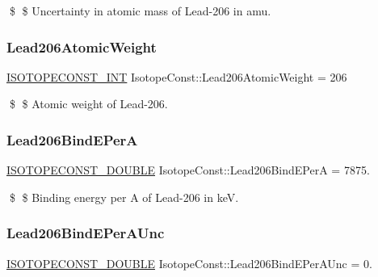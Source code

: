 \$ \$ Uncertainty in atomic mass of Lead-\/206 in amu. \mbox{\label{group___isotope_const-_lead-_pb206_ga0783575b865cbbc1b8d82b9f4f8f1622}} 
\subsubsection{\texorpdfstring{Lead206\+Atomic\+Weight}{Lead206AtomicWeight}}
{\footnotesize\ttfamily \mbox{\hyperlink{group___isotope_const-_macros_ga5f18360b3e99483a35c32d789e62621c}{I\+S\+O\+T\+O\+P\+E\+C\+O\+N\+S\+T\+\_\+\+I\+NT}} Isotope\+Const\+::\+Lead206\+Atomic\+Weight = 206}

\$ \$ Atomic weight of Lead-\/206. \mbox{\label{group___isotope_const-_lead-_pb206_gac103f3b85ac23ec8ef0ff84c8c10b5c0}} 
\subsubsection{\texorpdfstring{Lead206\+Bind\+E\+PerA}{Lead206BindEPerA}}
{\footnotesize\ttfamily \mbox{\hyperlink{group___isotope_const-_macros_ga8f45a7272ce02c0b4c65c44636ed719a}{I\+S\+O\+T\+O\+P\+E\+C\+O\+N\+S\+T\+\_\+\+D\+O\+U\+B\+LE}} Isotope\+Const\+::\+Lead206\+Bind\+E\+PerA = 7875.}

\$ \$ Binding energy per A of Lead-\/206 in keV. \mbox{\label{group___isotope_const-_lead-_pb206_ga76866f2f4dfe0a7f9b1a2d2f0df6534a}} 
\subsubsection{\texorpdfstring{Lead206\+Bind\+E\+Per\+A\+Unc}{Lead206BindEPerAUnc}}
{\footnotesize\ttfamily \mbox{\hyperlink{group___isotope_const-_macros_ga8f45a7272ce02c0b4c65c44636ed719a}{I\+S\+O\+T\+O\+P\+E\+C\+O\+N\+S\+T\+\_\+\+D\+O\+U\+B\+LE}} Isotope\+Const\+::\+Lead206\+Bind\+E\+Per\+A\+Unc = 0.}

